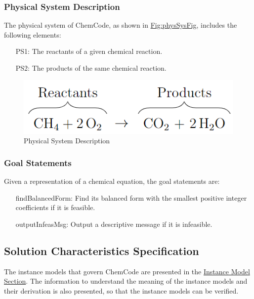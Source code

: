 \documentclass[12pt]{article}
\begin{document}
\subsubsection{Physical System Description}
\label{Sec:PhysSyst}
The physical system of ChemCode, as shown in \hyperref[Figure:physSysFig]{Fig:physSysFig}, includes the following elements:

\begin{itemize}
\item[PS1:]{The reactants of a given chemical reaction.}
\item[PS2:]{The products of the same chemical reaction.}
\end{itemize}
\begin{figure}
\begin{center}
\includegraphics[width=\textwidth]{../../../../datafiles/chemcode/physSysFig.png}
\caption{Physical System Description}
\label{Figure:physSysFig}
\end{center}
\end{figure}
\subsubsection{Goal Statements}
\label{Sec:GoalStmt}
Given a representation of a chemical equation, the goal statements are:

\begin{itemize}
\item[findBalancedForm:\phantomsection\label{findBalancedForm}]{Find its balanced form with the smallest positive integer coefficients if it is feasible.}
\item[outputInfeasMsg:\phantomsection\label{outputInfeasMsg}]{Output a descriptive message if it is infeasible.}
\end{itemize}
\subsection{Solution Characteristics Specification}
\label{Sec:SolCharSpec}
The instance models that govern ChemCode are presented in the \hyperref[Sec:IMs]{Instance Model Section}. The information to understand the meaning of the instance models and their derivation is also presented, so that the instance models can be verified.
\end{document}
